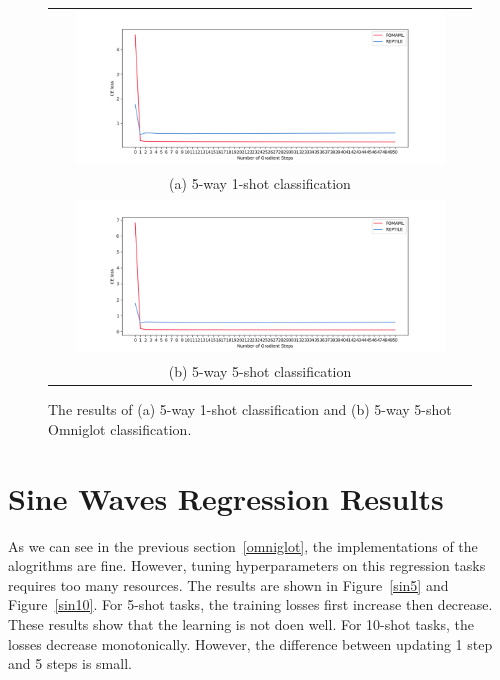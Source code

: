 \documentclass[final]{cvpr}
\begin{document}
\begin{figure}[b]
    \centering
	\begin{tabular}{c}
		\includegraphics[width=0.9\textwidth]{resources/omniglot_5way_1shot.png}\\
		(a) 5-way 1-shot classification\\
		\includegraphics[width=0.9\textwidth]{resources/omniglot_5way_5shot.png}\\
		(b) 5-way 5-shot classification\\
	\end{tabular}\vspace{0.2cm}
	\caption{The results of (a) 5-way 1-shot classification and (b) 5-way 5-shot Omniglot classification.}
	\label{comp2}
\end{figure}


\section{Sine Waves Regression Results}
As we can see in the previous section~\ref{omniglot}, the implementations of the alogrithms are fine. However, tuning hyperparameters on this regression tasks requires too many resources. The results are shown in Figure~\ref{sin5} and Figure~\ref{sin10}. For 5-shot tasks, the training losses first increase then decrease. These results show that the learning is not doen well. For 10-shot tasks, the losses decrease monotonically. However, the difference between updating 1 step and 5 steps is small.
\end{document}
